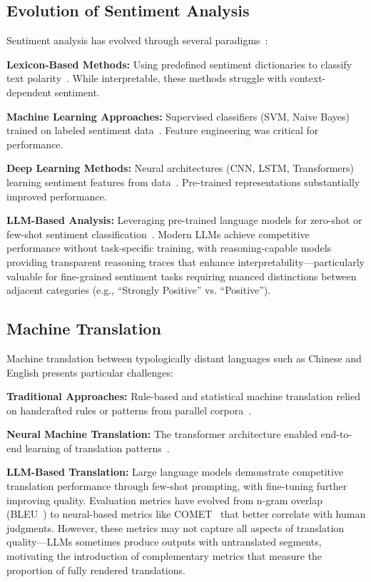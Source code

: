 \subsection{Evolution of Sentiment Analysis}

Sentiment analysis has evolved through several paradigms~\cite{wang2025chinese_sentiment}:

\textbf{Lexicon-Based Methods:} Using predefined sentiment dictionaries to classify text polarity~\cite{mohammad2013nrc}. While interpretable, these methods struggle with context-dependent sentiment.

\textbf{Machine Learning Approaches:} Supervised classifiers (SVM, Naive Bayes) trained on labeled sentiment data~\cite{pang2002sentiment}. Feature engineering was critical for performance.

\textbf{Deep Learning Methods:} Neural architectures (CNN, LSTM, Transformers) learning sentiment features from data~\cite{socher2013recursive}. Pre-trained representations substantially improved performance.

\textbf{LLM-Based Analysis:} Leveraging pre-trained language models for zero-shot or few-shot sentiment classification~\cite{zhang2024sentiment}. Modern LLMs achieve competitive performance without task-specific training, with reasoning-capable models providing transparent reasoning traces that enhance interpretability---particularly valuable for fine-grained sentiment tasks requiring nuanced distinctions between adjacent categories (e.g., ``Strongly Positive'' vs. ``Positive'').

\subsection{Machine Translation}

Machine translation between typologically distant languages such as Chinese and English presents particular challenges:

\textbf{Traditional Approaches:} Rule-based and statistical machine translation relied on handcrafted rules or patterns from parallel corpora~\cite{koehn2009smt}.

\textbf{Neural Machine Translation:} The transformer architecture enabled end-to-end learning of translation patterns~\cite{vaswani2017attention}.

\textbf{LLM-Based Translation:} Large language models demonstrate competitive translation performance through few-shot prompting, with fine-tuning further improving quality. Evaluation metrics have evolved from n-gram overlap (BLEU~\cite{papineni2002bleu}) to neural-based metrics like COMET~\cite{rei2022comet} that better correlate with human judgments. However, these metrics may not capture all aspects of translation quality---LLMs sometimes produce outputs with untranslated segments, motivating the introduction of complementary metrics that measure the proportion of fully rendered translations.

